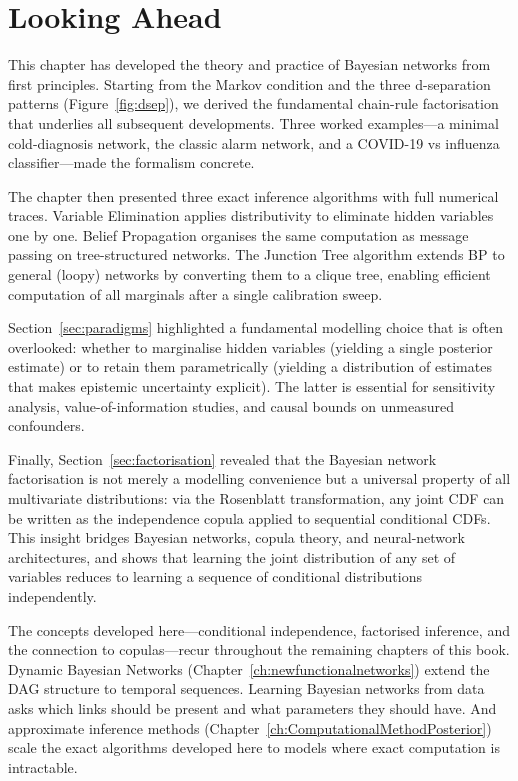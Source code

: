 \section{Looking Ahead}\label{sec:conclusion}

This chapter has developed the theory and practice of Bayesian networks from
first principles. Starting from the Markov condition and the three
d-separation patterns (Figure~\ref{fig:dsep}), we derived the fundamental
chain-rule factorisation that underlies all subsequent developments. Three
worked examples---a minimal cold-diagnosis network, the classic alarm network,
and a COVID-19 vs influenza classifier---made the formalism concrete.

The chapter then presented three exact inference algorithms with full numerical
traces. Variable Elimination applies distributivity to eliminate hidden
variables one by one. Belief Propagation organises the same computation as
message passing on tree-structured networks. The Junction Tree algorithm
extends BP to general (loopy) networks by converting them to a clique tree,
enabling efficient computation of all marginals after a single calibration
sweep.

Section~\ref{sec:paradigms} highlighted a fundamental modelling choice that
is often overlooked: whether to marginalise hidden variables (yielding a
single posterior estimate) or to retain them parametrically (yielding a
distribution of estimates that makes epistemic uncertainty explicit). The
latter is essential for sensitivity analysis, value-of-information studies,
and causal bounds on unmeasured confounders.

Finally, Section~\ref{sec:factorisation} revealed that the Bayesian network
factorisation is not merely a modelling convenience but a universal property
of all multivariate distributions: via the Rosenblatt transformation, any
joint CDF can be written as the independence copula applied to sequential
conditional CDFs. This insight bridges Bayesian networks, copula theory, and
neural-network architectures, and shows that learning the joint distribution
of any set of variables reduces to learning a sequence of conditional
distributions independently.

The concepts developed here---conditional independence, factorised inference,
and the connection to copulas---recur throughout the remaining chapters of
this book. Dynamic Bayesian Networks (Chapter~\ref{ch:newfunctionalnetworks}) extend the
DAG structure to temporal sequences. Learning Bayesian networks from data
asks which links should be present and what
parameters they should have. And approximate inference methods
(Chapter~\ref{ch:ComputationalMethodPosterior}) scale the exact algorithms developed here to
models where exact computation is intractable.

